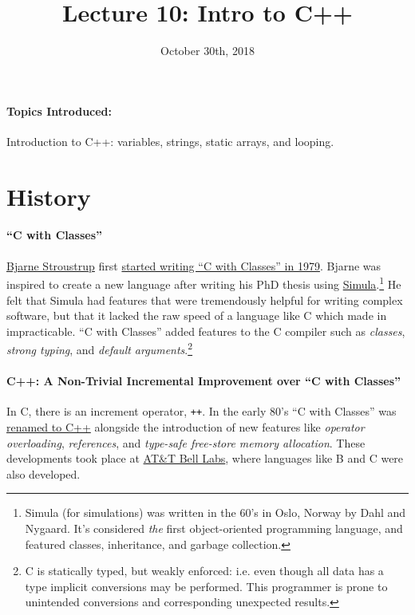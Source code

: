 \documentclass[12pt,letterpaper,twoside]{article}
\begin{document}
\title{Lecture 10: Intro to C++\vspace{-5ex}}
\date{October 30th, 2018}
\maketitle

{\footnotesize
\paragraph{Topics Introduced:} Introduction to C++: variables,
strings, static arrays, and looping.
}
\vspace{-3ex}
\section{History}
\vspace{-2.5ex}
\paragraph{``C with Classes''}
\href{https://en.wikipedia.org/wiki/Bjarne_Stroustrup}{Bjarne
  Stroustrup} first
\href{https://en.wikipedia.org/wiki/C%2B%2B#History}{started writing ``C with Classes'' in 1979}. 
  Bjarne was inspired to create a new language after writing his PhD
  thesis using
  \href{https://en.wikipedia.org/wiki/Simula}{Simula}.\footnote{Simula
    (for simulations)
    was written in the 60's in Oslo, Norway by Dahl and Nygaard. It's
    considered \emph{the} first object-oriented programming language,
    and featured classes, inheritance, and garbage collection.} He felt that Simula
  had features that were tremendously helpful for
  writing complex software, but that it lacked the raw speed of a language
  like C which made in impracticable.
  ``C with Classes'' added features to the C compiler such as
  \emph{classes}, \emph{strong typing}, and \emph{default
    arguments}.\footnote{C is statically typed, but weakly enforced:
    i.e. even though all data has a type
    implicit conversions may be performed. This programmer is prone to unintended
    conversions
    and corresponding unexpected results.}

  \paragraph{C++: A Non-Trivial Incremental Improvement over ``C with Classes''}
  In C, there is an increment operator, \texttt{++}. In
  the early 80's ``C with Classes'' was
  \href{https://en.wikipedia.org/wiki/The_C\%2B\%2B_Programming_Language}{renamed to C++}
  alongside the introduction of new features like \emph{operator overloading},
  \emph{references}, and \emph{type-safe free-store memory allocation}. These
  developments took place at
  \href{https://en.wikipedia.org/wiki/Bell_Labs}{AT\&T Bell Labs},
  where languages
  like B and C were also developed.
\end{document}
